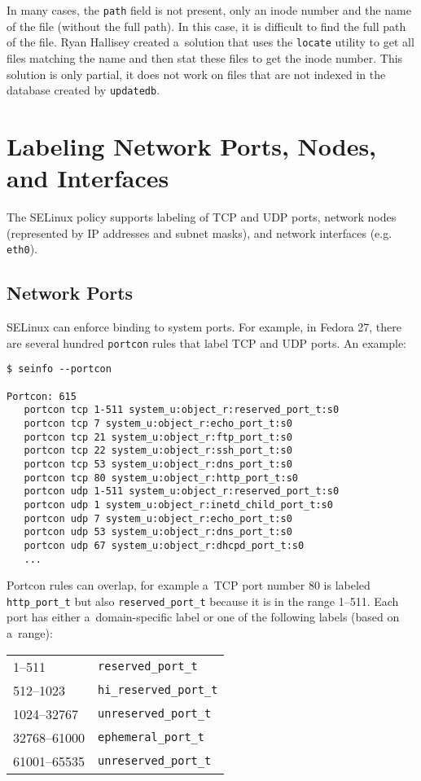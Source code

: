 In many cases, the \texttt{path} field is not present, only an inode number and
the name of the file (without the full path). In this case, it is difficult to
find the full path of the file. Ryan Hallisey created a~solution
\cite{restoreconpullreq} that uses the \texttt{locate} utility to get all files
matching the name and then stat these files to get the inode number. This
solution is only partial, it does not work on files that are not indexed in the
database created by \texttt{updatedb}.

\section{Labeling Network Ports, Nodes, and Interfaces}
\label{networkobjects}
The SELinux policy supports labeling of TCP and UDP ports, network nodes
(represented by IP addresses and subnet masks), and network interfaces (e.g.
\texttt{eth0}).

\subsection{Network Ports}
SELinux can enforce binding to system ports. For example, in Fedora 27, there
are several hundred \texttt{portcon} rules that label TCP and UDP ports.
An example:
\begin{lstlisting}
$ seinfo --portcon

Portcon: 615
   portcon tcp 1-511 system_u:object_r:reserved_port_t:s0
   portcon tcp 7 system_u:object_r:echo_port_t:s0
   portcon tcp 21 system_u:object_r:ftp_port_t:s0
   portcon tcp 22 system_u:object_r:ssh_port_t:s0
   portcon tcp 53 system_u:object_r:dns_port_t:s0
   portcon tcp 80 system_u:object_r:http_port_t:s0
   portcon udp 1-511 system_u:object_r:reserved_port_t:s0
   portcon udp 1 system_u:object_r:inetd_child_port_t:s0
   portcon udp 7 system_u:object_r:echo_port_t:s0
   portcon udp 53 system_u:object_r:dns_port_t:s0
   portcon udp 67 system_u:object_r:dhcpd_port_t:s0
   ...
\end{lstlisting}
Portcon rules can overlap, for example a~TCP port number 80 is labeled
\texttt{http\_port\_t} but also \texttt{reserved\_port\_t} because it is in the
range 1--511. Each port has either a~domain-specific label or one of the
following labels (based on a~range):

\begin{tabular}{l l}
    1--511 & \texttt{reserved\_port\_t} \\
    512--1023 & \texttt{hi\_reserved\_port\_t} \\
    1024--32767 & \texttt{unreserved\_port\_t} \\
    32768--61000 & \texttt{ephemeral\_port\_t} \\
    61001--65535 & \texttt{unreserved\_port\_t} \\
\end{tabular}

